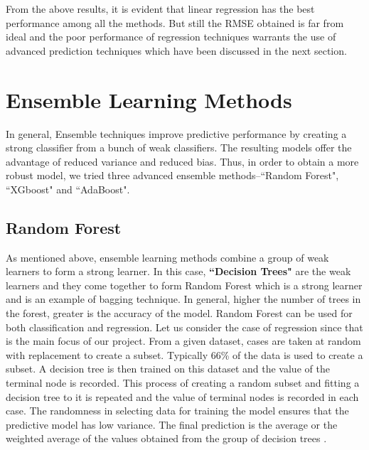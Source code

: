 \documentclass[12pt]{article}
\begin{document}
\noindent From the above results, it is evident that linear regression has the best performance among all the methods. But still the RMSE obtained is far from ideal and the poor performance of regression techniques warrants the use of advanced prediction techniques which have been discussed in the next section.





\section*{Ensemble Learning Methods}
 In general, Ensemble techniques improve predictive performance by creating a strong classifier from a bunch of weak classifiers. The resulting models offer the advantage of reduced variance and reduced bias\cite{ensemble}. Thus, in order to obtain a more robust model, we tried three advanced ensemble methods--``Random Forest"\cite{ran}, ``XGboost"\cite{XG} and 
``AdaBoost"\cite{Ada}.

\subsection*{Random Forest}
As mentioned above, ensemble learning methods combine a group of weak learners to form a strong learner. In this case, \textbf{``Decision Trees"} are the weak learners and they come together to form Random Forest which is a strong learner and is an example of bagging technique. In general, higher the number of trees in the forest, greater is the accuracy of the model\cite{RF1}. Random Forest can be used for both classification and regression. Let us consider the case of regression since that is the main focus of our project. From a given dataset, cases are taken at random with replacement to create a subset. Typically 66\% of the data is used to create a subset. A decision tree is then trained on this dataset and the value of the terminal node is recorded. This process of creating a random subset and fitting a decision tree to it is repeated and the value of terminal nodes is recorded in each case. The randomness in selecting data for training the model ensures that the predictive model has low variance. The final prediction is the average or the weighted average of the values obtained from the group of decision trees \cite{RF}.
\end{document}
